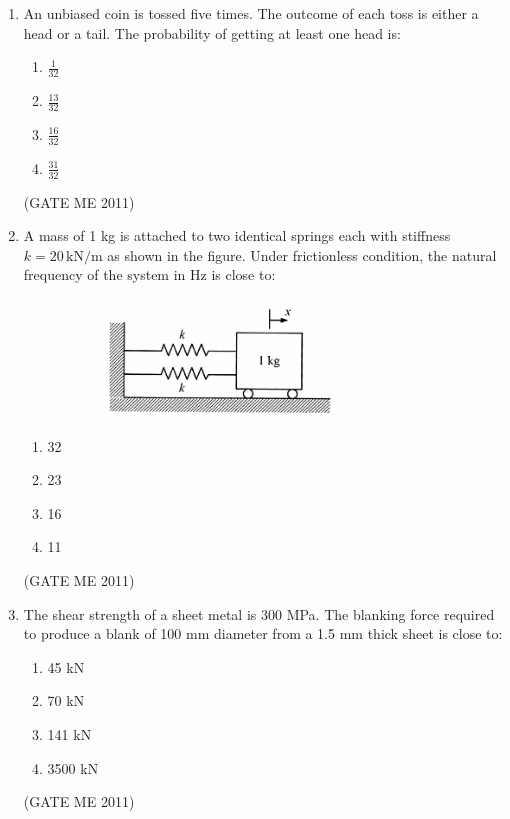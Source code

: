 \documentclass[journal]{IEEEtran}
\begin{document}
\begin{enumerate}
\item An unbiased coin is tossed five times. The outcome of each toss is either a head or a tail. The probability of getting at least one head is:
\begin{multicols}{4}
\begin{enumerate}
\item $ \frac{1}{32} $  
\item $ \frac{13}{32} $  
\item $ \frac{16}{32} $  
\item $ \frac{31}{32} $  
\end{enumerate}
\end{multicols}   
\hfill (GATE ME 2011)

\item A mass of 1 kg is attached to two identical springs each with stiffness $ k = 20\,\text{kN/m} $ as shown in the figure. Under frictionless condition, the natural frequency of the system in Hz is close to:

\begin{figure}[H]
    \centering
    \includegraphics[width=0.8\textwidth]{Fig 8.png}
    \caption{}
    \label{fig:question35}
\end{figure}

\begin{multicols}{4}
\begin{enumerate}
\item 32  
\item 23  
\item 16  
\item 11  
\end{enumerate}
\end{multicols}   
\hfill (GATE ME 2011)

\item The shear strength of a sheet metal is 300 MPa. The blanking force required to produce a blank of 100 mm diameter from a 1.5 mm thick sheet is close to:
\begin{multicols}{4}
\begin{enumerate}
\item 45 kN  
\item 70 kN  
\item 141 kN  
\item 3500 kN  
\end{enumerate}
\end{multicols}   
\hfill (GATE ME 2011)


\end{enumerate}
\end{document}
